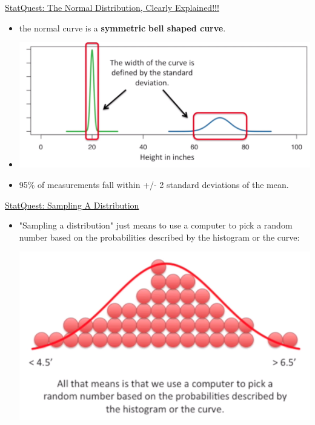 \documentclass[12pt, titlepage, french]{report}
\begin{document}
\begin{YTB_SUMM_AUTO_NUMB}[label = {SQ-norm-distr}]{\href{https://www.youtube.com/watch?v=rzFX5NWojp0&feature=youtu.be}{StatQuest: The Normal Distribution, Clearly Explained!!!}}
\begin{itemize}[leftmargin = *]
	\item	the normal curve is a \textbf{symmetric} \textbf{bell shaped curve}.
	\item	
	\begin{center}
	\includegraphics[scale=0.4]{src/SQ-STAT-norm-sd.png}
	\end{center}
	\item	95\% of measurements fall within +/- 2 standard deviations of the mean.
\end{itemize}
\end{YTB_SUMM_AUTO_NUMB}

\begin{YTB_SUMM_AUTO_NUMB}[label = {SQ-sample-distr}]{\href{https://www.youtube.com/watch?v=XLCWeSVzHUU&feature=youtu.be}{StatQuest: Sampling A Distribution
}}
\begin{itemize}[leftmargin = *]
	\item	"Sampling a distribution" just means to use a computer to pick a random number based on the probabilities described by the histogram or the curve:
		\begin{center}
		\includegraphics[scale=0.4]{src/SQ-HIST-BINS-sample.png}
		\end{center}
\end{itemize}
\end{YTB_SUMM_AUTO_NUMB}
\end{document}
